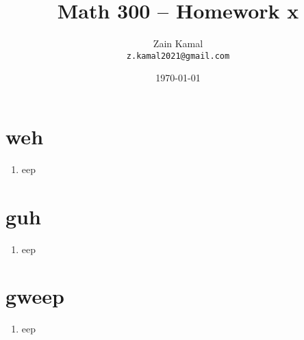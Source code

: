 \documentclass{article}
\title{Math 300 -- Homework x} %
\author{Zain Kamal\\ \texttt{z.kamal2021@gmail.com}} %
\date{\today} %
\begin{document}
\maketitle %

\section{weh} %

\begin{enumerate}[label=\alph*)]
    \item 
    eep
\end{enumerate}
    

\section{guh} %

\begin{enumerate}[label=\alph*)]
    \item 
    eep
\end{enumerate}
    
\section{gweep} %

\begin{enumerate}[label=\alph*)]
    \item 
    eep
\end{enumerate}
    
\end{document}

